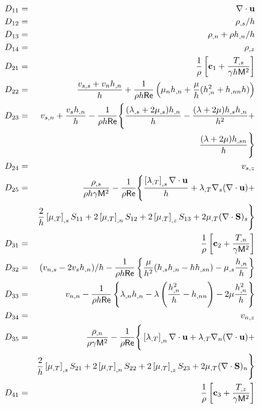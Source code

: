\pagebreak
{}
%
\begin{eqnarray} 
  D_{11} &=& \divu \\
  D_{12} &=& \rho_{,s} / h \\
  D_{13} &=& \rho_{,n} + \rho \hn / h \\
  D_{14} &=& \rho_{,z} \\
%
  D_{21} &=& \frac{1}{\rho} \left[ \bc_1 + 
             \frac{T_{,s}}{\gamma h \M^2} \right] \\
  D_{22} &=& \frac{\vvss + \vn\hn}{h} + \facth\left( \mu_n\hn + 
             \frac{\mu}{h} ( \hn^2 + \hnn h ) \right) \\
  D_{23} &=& \vsn + \frac{\vs\hn}{h} - \facth\Bigg\{\frac{(\lambda_{,s}+ 
             2\mu_{,s})\hn}{h} - \frac{(\lambda + 2\mu)\hs\hn}{h^2} + 
             \nonumber \\
         & & \frac{(\lambda+2\mu)\hsn}{h} \Bigg\} \\
  D_{24} &=& \vsz \\
  D_{25} &=& \frac{\rho_{,s}}{\rho h \gamma \M^2} - 
             \fact\Bigg\{ \frac{\left[\dlm\right]_{,s} \divu}{h} + 
             \dlm \nabla_s (\nabla \cdot \bu) + \nonumber \\
         & & \frac{2}{h}\left[\dmu\right]_{,s} S_{11} + 
             2\left[\dmu\right]_{,n} S_{12} + 2\left[\dmu\right]_{,z} S_{13} +
             2\dmu (\nabla \cdot \bS)_s \Bigg\} \\
%
  D_{31} &=& \frac{1}{\rho} \left[ \bc_2 + \frac{T_{,n}}{\gamma \M^2} \right]\\
  D_{32} &=& (\vns - 2 \vs \hn) / h - \facth\left\{ \frac{\mu}{h^2} 
             (\hs\hn - h \hsn) - \mu_{,s} \frac{\hn}{h} \right\} \\
  D_{33} &=& \vnn - \facth\left\{ \lambda_{,n} \hn - 
             \lambda\left( \frac{\hn^2}{h} - \hnn\right ) - 
             2 \mu\frac{\hn^2}{h} \right\} \\
  D_{34} &=& \vnz \\
  D_{35} &=& \frac{\rho_{,n}}{\rho \gamma \M^2} - 
             \fact\Bigg\{ \left[\dlm\right]_{,n} \divu + 
             \dlm \nabla_n (\nabla \cdot \bu) + \nonumber \\
         & & \frac{2}{h}\left[\dmu\right]_{,s} S_{21} +
             2\left[\dmu\right]_{,n} S_{22} + 2\left[\dmu\right]_{,z} S_{23} +
             2\dmu (\nabla \cdot \bS)_n \Bigg\} \\
%
  D_{41} &=& \frac{1}{\rho} \left[ \bc_3 + \frac{T_{,z}}{\gamma \M^2} \right]\\

\end{eqnarray}
